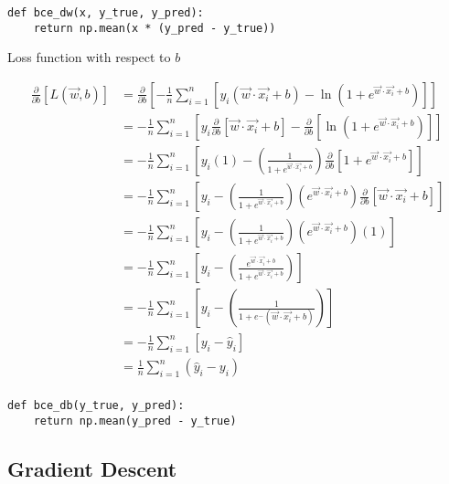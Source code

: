 \documentclass[openany]{book}
\begin{document}
\begin{tcolorbox}
\tiny
\begin{verbatim}
def bce_dw(x, y_true, y_pred):
    return np.mean(x * (y_pred - y_true))
\end{verbatim}
\end{tcolorbox}

    Loss function with respect to \(b\)

\begin{align*}
\frac{\partial}{\partial b}  [L(\vec{w}, b)] &= \frac{\partial}{\partial b} [-\frac{1}{n} \sum_{i=1}^{n} [y_i (\vec{w} \cdot \vec{x_i} + b) - \ln(1+e^{\vec{w} \cdot \vec{x_i} + b})]] \\
&= -\frac{1}{n} \sum_{i=1}^{n} [y_i \frac{\partial}{\partial b} [\vec{w} \cdot \vec{x_i} + b] - \frac{\partial}{\partial b}[\ln(1+e^{\vec{w} \cdot \vec{x_i} + b})]] \\
&= -\frac{1}{n} \sum_{i=1}^{n} [y_i (1) - (\frac{1}{1+e^{\vec{w} \cdot \vec{x_i} + b}}) \frac{\partial}{\partial b}[1+e^{\vec{w} \cdot \vec{x_i} + b}] ] \\
&= -\frac{1}{n} \sum_{i=1}^{n} [y_i - (\frac{1}{1+e^{\vec{w} \cdot \vec{x_i} + b}}) (e^{\vec{w} \cdot \vec{x_i} + b}) \frac{\partial}{\partial b}[\vec{w} \cdot \vec{x_i} + b]] \\
&= -\frac{1}{n} \sum_{i=1}^{n} [y_i - (\frac{1}{1+e^{\vec{w} \cdot \vec{x_i} + b}}) (e^{\vec{w} \cdot \vec{x_i} + b}) (1)] \\
&= -\frac{1}{n} \sum_{i=1}^{n} [y_i - (\frac{e^{\vec{w} \cdot \vec{x_i} + b}}{1+e^{\vec{w} \cdot \vec{x_i} + b}})] \\
&= -\frac{1}{n} \sum_{i=1}^{n} [y_i - (\frac{1}{1+e^-({\vec{w} \cdot \vec{x_i} + b})})] \\
&= -\frac{1}{n} \sum_{i=1}^{n} [y_i - \hat y_i] \\
&= \frac{1}{n} \sum_{i=1}^{n} (\hat y_i - y_i) \\
\end{align*}

\begin{tcolorbox}
\tiny
\begin{verbatim}
def bce_db(y_true, y_pred):
    return np.mean(y_pred - y_true)
\end{verbatim}
\end{tcolorbox}

    \subsection{Gradient Descent}\label{gradient-descent}
\end{document}
